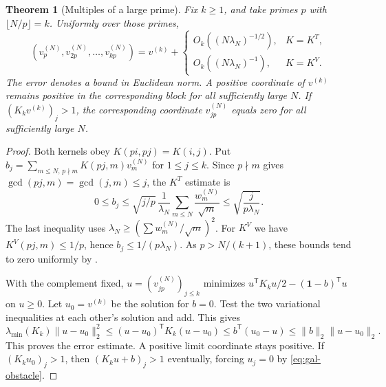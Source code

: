 \documentclass[11pt,a4paper]{article}
\newtheorem{theorem}{Theorem}[section]
\begin{document}
\begin{theorem}[Multiples of a large prime]\label{thm:gal-block}
Fix $k\ge1$, and take primes $p$ with $\lfloor N/p\rfloor=k$. Uniformly over those primes,
\[
 \left(v^{(N)}_{p},v^{(N)}_{2p},\dots,v^{(N)}_{kp}\right)
 =v^{(k)}+
 \begin{cases}
 O_k((N\lambda_N)^{-1/2}),&K=K^T,\\
 O_k((N\lambda_N)^{-1}),&K=K^V .
 \end{cases}
\]
The error denotes a bound in Euclidean norm. A positive coordinate of $v^{(k)}$ remains positive in the corresponding block for all sufficiently large $N$. If $(K_kv^{(k)})_j>1$, the corresponding coordinate $v^{(N)}_{jp}$ equals zero for all sufficiently large $N$.
\end{theorem}
\begin{proof}
Both kernels obey $K(pi,pj)=K(i,j)$. Put $b_j=\sum_{m\le N,\,p\nmid m}K(pj,m)v^{(N)}_m$ for $1\le j\le k$. Since $p\nmid m$ gives $\gcd(pj,m)=\gcd(j,m)\le j$, the $K^T$ estimate is
\[
 0\le b_j\le \sqrt{j/p}\,\frac{1}{\lambda_N}
       \sum_{m\le N}\frac{w^{(N)}_m}{\sqrt m}
 \le\sqrt{\frac{j}{p\lambda_N}}.
\]
The last inequality uses $\lambda_N\ge(\sum w^{(N)}_m/\sqrt m)^2$. For $K^V$ we have $K^V(pj,m)\le 1/p$, hence $b_j\le1/(p\lambda_N)$. As $p>N/(k+1)$, these bounds tend to zero uniformly by \cite[Theorem~1.1]{dmtgal}.

With the complement fixed, $u=(v^{(N)}_{jp})_{j\le k}$ minimizes $u^{\mathsf T}K_ku/2-(\boldsymbol1-b)^{\mathsf T}u$ on $u\ge0$. Let $u_0=v^{(k)}$ be the solution for $b=0$. Test the two variational inequalities at each other's solution and add. This gives
\[
 \lambda_{\min}(K_k)\|u-u_0\|_2^2
 \le (u-u_0)^{\mathsf T}K_k(u-u_0)
 \le b^{\mathsf T}(u_0-u)\le\|b\|_2\|u-u_0\|_2.
\]
This proves the error estimate. A positive limit coordinate stays positive. If $(K_ku_0)_j>1$, then $(K_ku+b)_j>1$ eventually, forcing $u_j=0$ by \eqref{eq:gal-obstacle}.
\end{proof}
\end{document}
